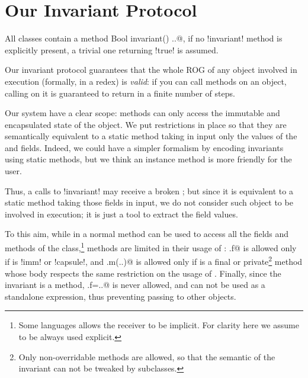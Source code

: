 \section{Our Invariant Protocol}
\label{s:protocol}
All classes contain a \Q@read method Bool invariant() {..}@, if no \Q!invariant! method is explicitly present, a trivial one returning \Q!true! is assumed.

Our invariant protocol guarantees that the whole ROG of any object involved in execution (formally, in a redex) is \emph{valid}: if you can call methods on an object, calling \Q@invariant@ on it is guaranteed to return \Q@true@ in a finite number of steps.

Our system have a clear scope:
\Q@invariant@ methods can only access the immutable and encapsulated state of the object.
We put restrictions in place so that they are semantically equivalent to a static method
taking in input only the values of the \Q@imm@ and \Q@capsule@ fields.
Indeed, we could have a simpler formalism by encoding invariants using static methods, but we think an instance method is more friendly for the user.

Thus, a calls to \Q!invariant! may receive a broken \Q@this@; but since it is equivalent to a static method taking those fields in input, we 
do not consider such \Q@this@ object to be involved in execution; it is just a tool to extract the field values.

To this aim, while in a normal method \Q@this@ can be used to access all the fields and methods of the class,\footnote{Some languages allows the \Q@this@ receiver to be implicit. For clarity here we assume \Q@this@ to be always used explicit.} \Q@invariant@ methods are limited in their usage of \Q@this@:
\Q@this.f@ is allowed only if \Q@f@ is \Q!imm! or \Q!capsule!, and 
\Q@this.m(..)@ is allowed only if \Q@m@ is a final or private\footnote{Only non-overridable methods are allowed, so that the semantic of the invariant can not be tweaked by subclasses.}
method whose body respects the same restriction on the usage of \Q@this@.
Finally, since the invariant is a \Q@read@ method,
\Q@this.f=..@ is never allowed, and \Q@this@ can not be used as a standalone expression, thus preventing passing \Q@this@ to other objects.

